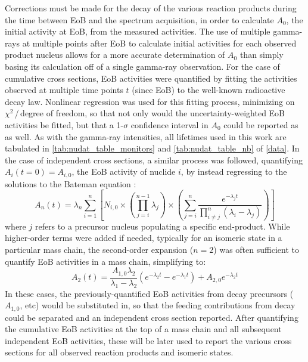 \documentclass[3p]{elsarticle}
\newcommand{\pp}[1]{\left( #1\right)}
\begin{document}
Corrections must be made for the decay of the various reaction products during the time between EoB and the spectrum acquisition, in order to calculate $A_0$, the initial activity at EoB, from the measured activities.
The use of  multiple gamma-rays at multiple points after EoB to calculate initial activities  for each observed product nucleus allows for a more accurate  determination of $A_0$ than simply basing its calculation off of a single gamma-ray observation.
For the case of cumulative cross sections, EoB activities were quantified by fitting the activities observed at multiple time points $t$ (since EoB) to the well-known radioactive decay law.
Nonlinear regression was used for this fitting process, minimizing on $\chi^2$\,/\,degree of freedom, so that not only would the uncertainty-weighted EoB activities be fitted, but that a 1-$\sigma$ confidence interval in $A_0$ could be reported as as well.
As with the gamma-ray intensities, all lifetimes used in this work are tabulated in \autoref{tab:nudat_table_monitors} and \autoref{tab:nudat_table_nb} of \ref{data}.
In the case of independent cross sections, a similar process was followed, quantifying $A_i\pp{t=0} = A_{i,0}$, the EoB activity of nuclide $i$, by instead regressing to the solutions to the Bateman equation \cite{bateman1910solution,Cetnar2006}:
\begin{equation}
A_n\pp{t} = \lambda_n \sum_{i=1}^n \left[  N_{i,0} \times \pp{\prod_{j=i}^{n-1}\lambda_j} \times \pp{\sum_{j=i}^n \dfrac{e^{-\lambda_j t}}{\prod_{i\neq j}^n \pp{\lambda_i - \lambda_j}}  }   \right]
\end{equation}
where $j$ refers to a precursor nucleus populating a specific end-product.  
While higher-order terms were added if needed, typically for an isomeric state in a particular mass chain,  the second-order expansion ($n=2$) was often sufficient to quantify EoB activities in a mass chain, simplifying to:
\begin{equation}
A_2\pp{t} = \dfrac{A_{1,0}\lambda_2}{\lambda_1 - \lambda_2} \pp{e^{-\lambda_2 t} - e^{-\lambda_1 t}} + A_{2,0} e^{-\lambda_2 t}
\end{equation}
In these cases, the previously-quantified EoB activities from decay precursors ($A_{1,0}$, etc) would be substituted in, so that the feeding contributions from decay could be separated and an independent cross section reported.
After quantifying the cumulative EoB activities at the top of a mass chain and all subsequent independent EoB activities, these will be later used to report the various cross sections for all observed reaction products and isomeric states. 
\end{document}

